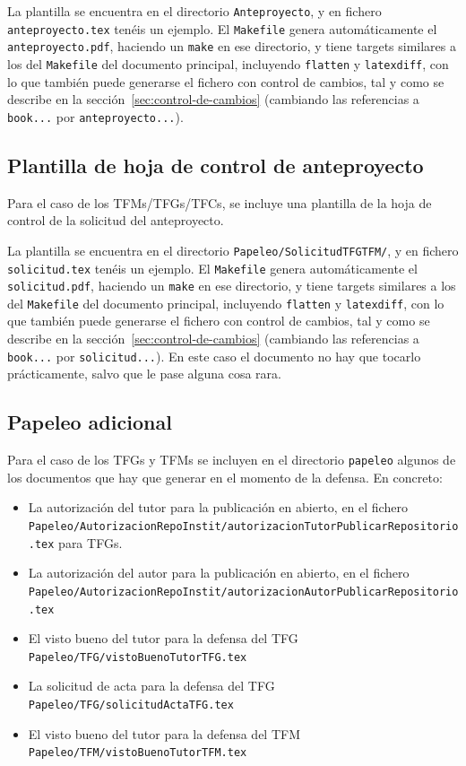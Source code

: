 \documentclass[spanish,openright]{book}
\begin{document}
La plantilla se encuentra en el directorio \texttt{Anteproyecto}, y en
fichero \texttt{anteproyecto.tex} tenéis un ejemplo. El
\texttt{Makefile} genera automáticamente el \texttt{anteproyecto.pdf},
haciendo un \texttt{make} en ese directorio, y tiene targets similares a los
del \texttt{Makefile} del documento principal, incluyendo
\texttt{flatten} y \texttt{latexdiff}, con lo que también puede
generarse el fichero con control de cambios, tal y como se describe en
la sección~\ref{sec:control-de-cambios} (cambiando las referencias a
\texttt{book...} por \texttt{anteproyecto...}).

\subsection{Plantilla de hoja de control de anteproyecto}
\label{sec:plantilla-de-hoja-control-anteproyecto}

Para el caso de los TFMs/TFGs/TFCs, se incluye una plantilla de la hoja
de control de la solicitud del anteproyecto.

La plantilla se encuentra en el directorio \texttt{Papeleo/SolicitudTFGTFM/}, y en
fichero \texttt{solicitud.tex} tenéis un ejemplo. El
\texttt{Makefile} genera automáticamente el \texttt{solicitud.pdf},
haciendo un \texttt{make} en ese directorio, y tiene targets similares a los
del \texttt{Makefile} del documento principal, incluyendo
\texttt{flatten} y \texttt{latexdiff}, con lo que también puede
generarse el fichero con control de cambios, tal y como se describe en
la sección~\ref{sec:control-de-cambios} (cambiando las referencias a
\texttt{book...} por \texttt{solicitud...}). En este caso el documento
no hay que tocarlo prácticamente, salvo que le pase alguna cosa rara.


\subsection{Papeleo adicional}
\label{sec:introapp1}

Para el caso de los TFGs y TFMs se incluyen en el directorio
\texttt{papeleo} algunos de los documentos que hay que generar en el
momento de la defensa. En concreto:

\begin{itemize}
\item La autorización del tutor para la publicación en abierto, en el
  fichero
  \texttt{Papeleo/AutorizacionRepoInstit/autorizacionTutorPublicarRepositorio.tex}
  para TFGs.
\item La autorización del autor para la publicación en abierto, en el
  fichero
  \texttt{Papeleo/AutorizacionRepoInstit/autorizacionAutorPublicarRepositorio.tex}
\item El visto bueno del tutor para la defensa del TFG
  \texttt{Papeleo/TFG/vistoBuenoTutorTFG.tex}
\item La solicitud de acta para la defensa del TFG
  \texttt{Papeleo/TFG/solicitudActaTFG.tex}
\item El visto bueno del tutor para la defensa del TFM
  \texttt{Papeleo/TFM/vistoBuenoTutorTFM.tex}
\end{itemize}
\end{document}
